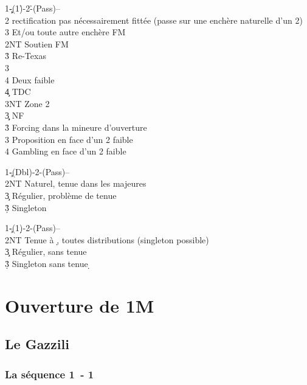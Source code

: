 \documentclass[a4paper]{article}
\begin{document}
\begin{bidtable}
1\c\d-(1\h)-2\h-(Pass)--\\
2\s \> rectification pas nécessairement fittée (passe sur une enchère naturelle d'un 2\s )\+\\
3\s \> Et/ou toute autre enchère FM\-\\
2NT \> Soutien FM\+\\
3\h \> Re-Texas\+\\
3\s\+\\
4\s \> Deux faible\\
4\c \> TDC\\
3NT \> Zone 2\-\-\-\\
3\c\d \> NF\\
3\h \> Forcing dans la mineure d'ouverture\\
3\s \> Proposition en face d'un 2 faible\\
4\s \> Gambling en face d'un 2 faible
\end{bidtable}

\begin{bidtable}
1\c-(Dbl)-2\s-(Pass)--\\
2NT \> Naturel, tenue dans les majeures\\
3\c \> Régulier, problème de tenue\\
3\d\h\s \> Singleton
\end{bidtable}

\begin{bidtable}
1\c-(1\d)-2\s-(Pass)--\\
2NT \> Tenue à \d , toutes distributions (singleton possible)\\
3\c \> Régulier, sans tenue \d \\
3\d\h\s \> Singleton sans tenue \d 
\end{bidtable}

\section{Ouverture de 1M}

\subsection{Le Gazzili}

\subsubsection{La séquence 1\pdfh\ - 1\pdfs}
\end{document}
